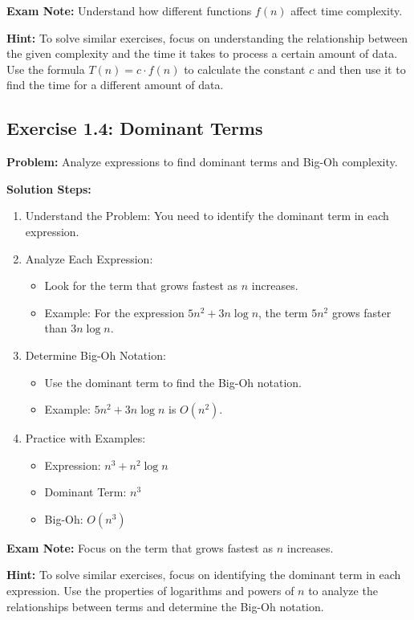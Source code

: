 \textbf{Exam Note:} Understand how different functions $f(n)$ affect time complexity.

\textbf{Hint:} To solve similar exercises, focus on understanding the relationship between the given complexity and the time it takes to process a certain amount of data. Use the formula $T(n) = c \cdot f(n)$ to calculate the constant $c$ and then use it to find the time for a different amount of data.

\subsection{Exercise 1.4: Dominant Terms}
\textbf{Problem:} Analyze expressions to find dominant terms and Big-Oh complexity.

\vspace{0.5em}
\textbf{Solution Steps:}
\begin{enumerate}[leftmargin=*,noitemsep]
    \item Understand the Problem: You need to identify the dominant term in each expression.
    \item Analyze Each Expression:
    \begin{itemize}
        \item Look for the term that grows fastest as $n$ increases.
        \item Example: For the expression $5n^2 + 3n \log n$, the term $5n^2$ grows faster than $3n \log n$.
    \end{itemize}
    \item Determine Big-Oh Notation:
    \begin{itemize}
        \item Use the dominant term to find the Big-Oh notation.
        \item Example: $5n^2 + 3n \log n$ is $O(n^2)$.
    \end{itemize}
    \item Practice with Examples:
    \begin{itemize}
        \item Expression: $n^3 + n^2 \log n$
        \item Dominant Term: $n^3$
        \item Big-Oh: $O(n^3)$
    \end{itemize}
\end{enumerate}

\textbf{Exam Note:} Focus on the term that grows fastest as $n$ increases.

\textbf{Hint:} To solve similar exercises, focus on identifying the dominant term in each expression. Use the properties of logarithms and powers of $n$ to analyze the relationships between terms and determine the Big-Oh notation.

